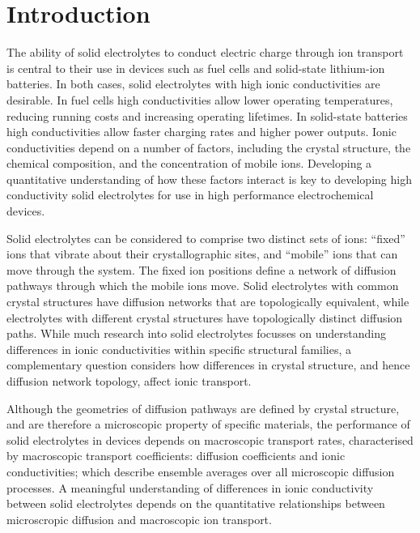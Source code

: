 \documentclass[aps,prb,twocolumn,superscriptaddress,reprint]{revtex4-1}
\begin{document}
\maketitle

\section{Introduction}

The ability of solid electrolytes to conduct electric charge through ion transport is central to their use in devices such as fuel cells and solid-state lithium-ion batteries.\cite{BachmanEtAl_ChemRev2016, ManthiramEtAl_NatRevMater2017,GoodenoughAndSingh_JElectrochemSoc2015, MalavasiEtAl_ChemSocRev2010} In both cases, solid electrolytes with high ionic conductivities are desirable. In fuel cells high conductivities allow lower operating temperatures, reducing running costs and increasing operating lifetimes. In solid-state batteries high conductivities allow faster charging rates and higher power outputs. Ionic conductivities depend on a number of factors, including the crystal structure, the chemical composition, and the concentration of mobile ions.\cite{VanDerVenEtAl_AccChemRes2013} Developing a quantitative understanding of how these factors interact is key to developing high conductivity solid electrolytes for use in high performance electrochemical devices.

Solid electrolytes can be considered to comprise two distinct sets of ions: ``fixed'' ions that vibrate about their crystallographic sites, and ``mobile'' ions that can move through the system. The fixed ion positions define a network of diffusion pathways through which the mobile ions move. Solid electrolytes with common crystal structures have diffusion networks that are topologically equivalent, while electrolytes with different crystal structures have topologically distinct diffusion paths. While much research into solid electrolytes focusses on understanding differences in ionic conductivities within specific structural families, a complementary question considers how differences in crystal structure, and hence diffusion network topology, affect ionic transport.

Although the geometries of diffusion pathways are defined by crystal structure, and are therefore a microscopic property of specific materials, the performance of solid electrolytes in devices depends on macroscopic transport rates, characterised by macroscopic transport coefficients: diffusion coefficients and ionic conductivities; which describe ensemble averages over all microscopic diffusion processes. A meaningful understanding of differences in ionic conductivity between solid electrolytes depends on the quantitative relationships between microscropic diffusion and macroscopic ion transport.
\end{document}
